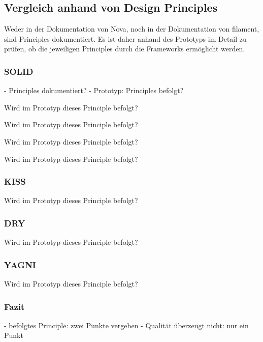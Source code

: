 \color{red}

\subsection{Vergleich anhand von Design Principles}
Weder in der Dokumentation von Nova, noch in der Dokumentation von filament, sind Principles dokumentiert.
Es ist daher anhand des Prototyps im Detail zu prüfen, ob die jeweiligen Principles durch die Frameworks ermöglicht werden.

\subsubsection{SOLID}
- Principles dokumentiert?
- Prototyp: Principles befolgt?

Wird im Prototyp dieses Principle befolgt?

Wird im Prototyp dieses Principle befolgt?

Wird im Prototyp dieses Principle befolgt?

Wird im Prototyp dieses Principle befolgt?

\subsubsection{KISS}
Wird im Prototyp dieses Principle befolgt?

\subsubsection{DRY}
Wird im Prototyp dieses Principle befolgt?

\subsubsection{YAGNI}
Wird im Prototyp dieses Principle befolgt?

\subsubsection{Fazit}
- befolgtes Principle: zwei Punkte vergeben
- Qualität überzeugt nicht: nur ein Punkt

\color{black}
